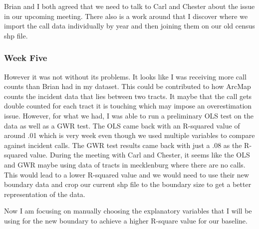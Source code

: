 \documentclass[onecolumn, draftclsnofoot,10pt, compsoc]{IEEEtran}
\begin{document}
\begin{singlespace}
Brian and I both agreed that we need to talk to Carl and Chester about the issue in our upcoming meeting.
There also is a work around that I discover where we import the call data individually by year and then joining them on our old census shp file.

\subsubsection{Week Five} \label{k_w5}
However it was not without its problems.
It looks like I was receiving more call counts than Brian had in my dataset.
This could be contributed to how ArcMap counts the incident data that lies between two tracts.
It maybe that the call gets double counted for each tract it is touching which may impose an overestimation issue.
However, for what we had, I was able to run a preliminary OLS test on the data as well as a GWR test.
The OLS came back with an R-squared value of around .01 \label{k_regression} which is very week even though we used multiple variables to compare against incident calls.
The GWR test results came back with just a .08 as the R-squared value.
During the meeting with Carl and Chester, it seems like the OLS and GWR maybe using data of tracts in mecklenburg where there are no calls.
This would lead to a lower R-squared value and we would need to use their new boundary data and crop our current shp file to the boundary size to get a better representation of the data.

Now I am focusing on manually choosing the explanatory variables that I will be using for the new boundary to achieve a higher R-square value for our baseline.

\end{singlespace}
%
\end{document}
